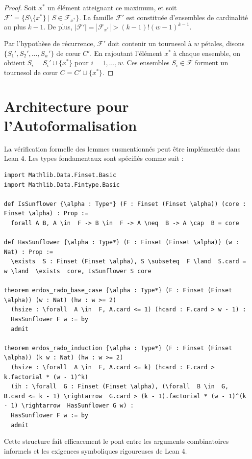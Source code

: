 \documentclass[12pt,a4paper]{article}
\begin{document}
\begin{proof}
Soit $x^*$ un \'el\'ement atteignant ce maximum, et soit $\mathcal{F}' = \{ S \setminus \{x^*\} \mid S \in \mathcal{F}_{x^*} \}$. La famille $\mathcal{F}'$ est constitu\'ee d'ensembles de cardinalit\'e au plus $k-1$. De plus, $|\mathcal{F}'| = |\mathcal{F}_{x^*}| > (k-1)!(w-1)^{k-1}$.

Par l'hypoth\`ese de r\'ecurrence, $\mathcal{F}'$ doit contenir un tournesol \`a $w$ p\'etales, disons $\{ S_1', S_2', \dots, S_w' \}$ de c{\oe}ur $C'$. En rajoutant l'\'el\'ement $x^*$ \`a chaque ensemble, on obtient $S_i = S_i' \cup \{x^*\}$ pour $i = 1, \dots, w$. Ces ensembles $S_i \in \mathcal{F}$ forment un tournesol de c{\oe}ur $C = C' \cup \{x^*\}$.
\end{proof}

\section{Architecture pour l'Autoformalisation}
La v\'erification formelle des lemmes susmentionn\'es peut \^etre impl\'ement\'ee dans Lean 4. Les types fondamentaux sont sp\'ecifi\'es comme suit :

\begin{lstlisting}[basicstyle=\ttfamily\small, breaklines=true]
import Mathlib.Data.Finset.Basic
import Mathlib.Data.Fintype.Basic

def IsSunflower {\alpha : Type*} (F : Finset (Finset \alpha)) (core : Finset \alpha) : Prop :=
  forall A B, A \in  F -> B \in  F -> A \neq  B -> A \cap  B = core

def HasSunflower {\alpha : Type*} (F : Finset (Finset \alpha)) (w : Nat) : Prop :=
  \exists  S : Finset (Finset \alpha), S \subseteq  F \land  S.card = w \land  \exists  core, IsSunflower S core

theorem erdos_rado_base_case {\alpha : Type*} (F : Finset (Finset \alpha)) (w : Nat) (hw : w >= 2)
  (hsize : \forall  A \in  F, A.card <= 1) (hcard : F.card > w - 1) :
  HasSunflower F w := by
  admit

theorem erdos_rado_induction {\alpha : Type*} (F : Finset (Finset \alpha)) (k w : Nat) (hw : w >= 2)
  (hsize : \forall  A \in  F, A.card <= k) (hcard : F.card > k.factorial * (w - 1)^k)
  (ih : \forall  G : Finset (Finset \alpha), (\forall  B \in  G, B.card <= k - 1) \rightarrow  G.card > (k - 1).factorial * (w - 1)^(k - 1) \rightarrow  HasSunflower G w) :
  HasSunflower F w := by
  admit
\end{lstlisting}

Cette structure fait efficacement le pont entre les arguments combinatoires informels et les exigences symboliques rigoureuses de Lean 4.
\end{document}
